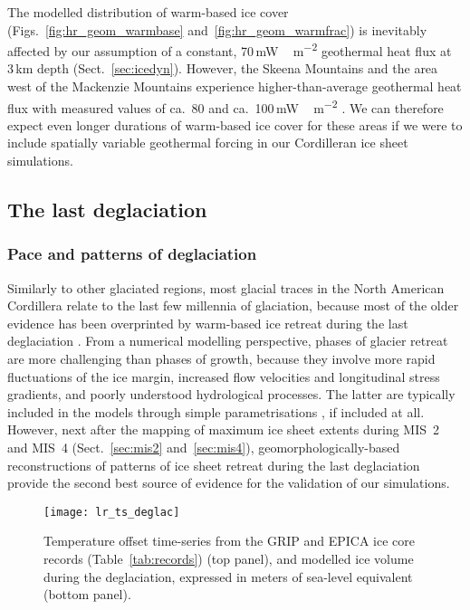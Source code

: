 \documentclass[tc, manuscript]{copernicus}
\begin{document}
The modelled distribution of warm-based ice cover (Figs.~\ref{fig:hr_geom_warmbase}
and~\ref{fig:hr_geom_warmfrac}) is inevitably affected by our assumption of a constant,
70\,\unit{mW\,m^{-2}} geothermal heat flux at 3\,km depth
(Sect.~\ref{sec:icedyn}). However, the Skeena Mountains and the area west of
the Mackenzie Mountains experience higher-than-average geothermal heat flux
with measured values of ca.~80 and ca.~100\,\unit{mW\,m^{-2}}
\citep{Blackwell.Richards.2004}. We can therefore expect even longer
durations of warm-based ice cover for these areas if we were to include
spatially variable geothermal forcing in our Cordilleran ice sheet simulations.


\subsection{The last deglaciation}

\subsubsection{Pace and patterns of deglaciation}

Similarly to other glaciated regions, most glacial traces in the North American
Cordillera relate to the last few millennia of glaciation, because most of the
older evidence has been overprinted by warm-based ice retreat
during the last deglaciation \citep{Kleman.1994, Kleman.etal.2010}. From a
numerical modelling perspective, phases of glacier retreat are more challenging
than phases of growth, because they involve more rapid fluctuations of the ice
margin, increased flow velocities and longitudinal stress gradients, and poorly
understood hydrological processes. The latter are typically included in the
models through simple parametrisations \citep[e.g.][]{Clason.etal.2012,
Clason.etal.2014, Bueler.Pelt.2015}, if included at all. However, next after
the mapping of maximum ice sheet extents during MIS~2 and MIS~4
(Sect.~\ref{sec:mis2} and~\ref{sec:mis4}), geomorphologically-based
reconstructions of patterns of ice sheet retreat during the last
deglaciation provide the second best source of evidence for the validation of
our simulations.

\begin{figure}
  \texttt{[image: lr\_ts\_deglac]}
  \caption{Temperature offset time-series from the GRIP and EPICA ice core
           records (Table~\ref{tab:records}) (top panel), and modelled ice
           volume during the deglaciation, expressed in meters of sea-level
           equivalent (bottom panel).}
  \label{fig:lr_ts_deglac}
\end{figure}
\end{document}
